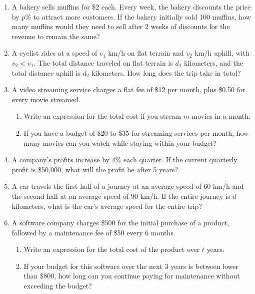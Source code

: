 \documentclass{article}
\begin{document}
\begin{enumerate}[leftmargin = 0.5cm, label = \arabic*., rightmargin = 0.2cm]

    \item A bakery sells muffins for \$2 each. Every week, the bakery discounts the price by $p\%$ to attract more customers. If the bakery initially sold 100 muffins, how many muffins would they need to sell after 2 weeks of discounts for the revenue to remain the same?

    \item A cyclist rides at a speed of $v_1$ km/h on flat terrain and $v_2$ km/h uphill, with $v_2 < v_1$. The total distance traveled on flat terrain is $d_1$ kilometers, and the total distance uphill is $d_2$ kilometers. How long does the trip take in total?

    \item A video streaming service charges a flat fee of \$12 per month, plus \$0.50 for every movie streamed.

    \begin{enumerate}[leftmargin = 0.5cm, label = (\alph*), rightmargin = 0.2cm]
        \item Write an expression for the total cost if you stream $m$ movies in a month.
        \item If you have a budget of \$20 to \$35 for streaming services per month, how many movies can you watch while staying within your budget?
    \end{enumerate}

    \item A company's profits increase by $4\%$ each quarter. If the current quarterly profit is \$50,000, what will the profit be after 5 years?

    \item A car travels the first half of a journey at an average speed of $60$ km/h and the second half at an average speed of $90$ km/h. If the entire journey is $d$ kilometers, what is the car’s average speed for the entire trip?

    \item A software company charges \$500 for the initial purchase of a product, followed by a maintenance fee of \$50 every $6$ months. 

    \begin{enumerate}[leftmargin = 0.5cm, label = (\alph*), rightmargin = 0.2cm]
        \item Write an expression for the total cost of the product over $t$ years.
        \item If your budget for this software over the next $3$ years is between lower than $\$800$, how long can you continue paying for maintenance without exceeding the budget?
    \end{enumerate}

\end{enumerate}
\end{document}
